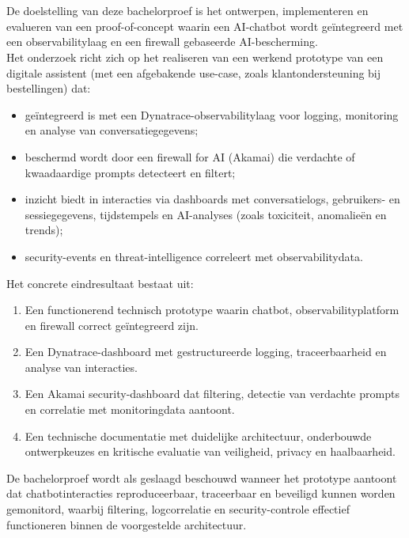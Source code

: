 \section{}%
\label{sec:onderzoeksdoelstelling}

De doelstelling van deze bachelorproef is het ontwerpen, implementeren en evalueren van een proof-of-concept waarin een AI-chatbot wordt geïntegreerd met een observabilitylaag en een firewall gebaseerde AI-bescherming.\\

Het onderzoek richt zich op het realiseren van een werkend prototype van een digitale assistent (met een afgebakende use-case, zoals klantondersteuning bij bestellingen) dat:

\begin{itemize}
    \item geïntegreerd is met een Dynatrace-observabilitylaag voor logging, monitoring en analyse van conversatiegegevens;
    \item beschermd wordt door een firewall for AI (Akamai) die verdachte of kwaadaardige prompts detecteert en filtert;
    \item inzicht biedt in interacties via dashboards met conversatielogs, gebruikers- en sessiegegevens, tijdstempels en AI-analyses (zoals toxiciteit, anomalieën en trends);
    \item security-events en threat-intelligence correleert met observabilitydata.
\end{itemize}

Het concrete eindresultaat bestaat uit:

\begin{enumerate}
    \item Een functionerend technisch prototype waarin chatbot, observabilityplatform en firewall correct geïntegreerd zijn.
    \item Een Dynatrace-dashboard met gestructureerde logging, traceerbaarheid en analyse van interacties.
    \item Een Akamai security-dashboard dat filtering, detectie van verdachte prompts en correlatie met monitoringdata aantoont.
    \item Een technische documentatie met duidelijke architectuur, onderbouwde ontwerpkeuzes en kritische evaluatie van veiligheid, privacy en haalbaarheid.
\end{enumerate}

De bachelorproef wordt als geslaagd beschouwd wanneer het prototype aantoont dat chatbotinteracties reproduceerbaar, traceerbaar en beveiligd kunnen worden gemonitord, waarbij filtering, logcorrelatie en security-controle effectief functioneren binnen de voorgestelde architectuur.


